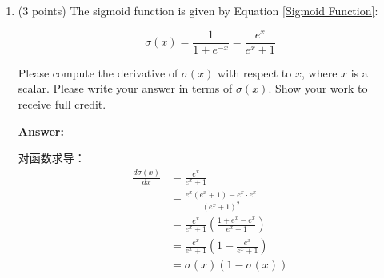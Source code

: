 \documentclass{article}
\newenvironment{answer}{
    {\bf Answer:} \sf \begingroup\color{red}
}{\endgroup}%
\begin{document}
\begin{enumerate}[label=(\alph*)]
Where $x$ is a scalar and $0<\alpha <1$, please compute the derivative of $f(x)$ with respect to $x$. You may ignore the case where the derivative is not defined at 0.\footnote{If you're interested in how to handle the derivative at this point, you can read more about the notion of \hyperref[https://en.wikipedia.org/wiki/Subderivative]{subderivatives}.}

\begin{shaded}
\begin{answer}
当x>0时，
\begin{equation}
	\frac{\partial f(x)}{\partial x} = \frac{\partial x}{x} = 1
\end{equation}

当x<0时，
\begin{equation}
	\frac{\partial f(x)}{\partial x} = \frac{\partial \alpha x}{x} = \alpha
\end{equation}

综上，
\begin{equation}
	\frac{\partial f(x)}{\partial x} =  \left\{ 
	\begin{array}{c}
		1 , x>0 \\
		\alpha, x<0
	\end{array}
	\right.
\end{equation}
\end{answer}
\end{shaded}

\item (3 points) The sigmoid function is given by Equation \ref{Sigmoid Function}:

\begin{equation}
    \label{Sigmoid Function}
    \sigma (x) = \frac{1}{1 + e^{-x}} = \frac{e^{x}}{e^{x} + 1}
\end{equation}

Please compute the derivative of $\sigma(x)$ with respect to $x$, where $x$ is a scalar. Please write your answer in terms of $\sigma(x)$. Show your work to receive full credit.

\begin{shaded}
\begin{answer}
对函数求导：
\begin{equation}
\begin{array}{ll}
		\frac{d \sigma(x)}{d x} &= \frac{e^x}{e^x+1} \\
			&= \frac{e^x(e^x+1)-e^x \cdot e^x}{(e^x+1)^2} \\
			&= \frac{e^x}{e^x+1} (\frac{1+e^x-e^x}{e^x+1}) \\
			&= \frac{e^x}{e^x+1} (1-\frac{e^x}{e^x+1}) \\
			&= \sigma(x) (1-\sigma(x))
\end{array}
\end{equation}
\end{answer}
\end{shaded}


\end{enumerate}
\end{document}
